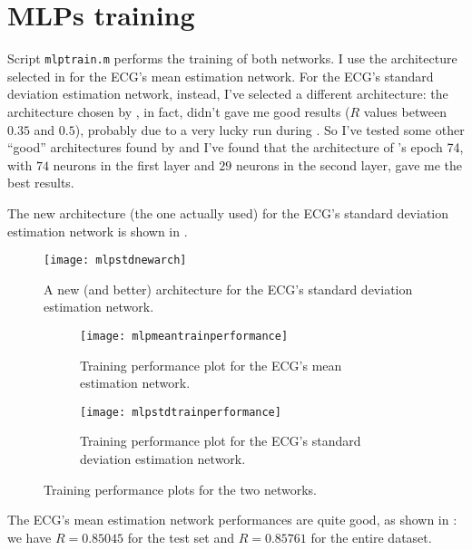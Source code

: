 \section{MLPs training}\label{sec:mlptraining}

Script \texttt{mlptrain.m} performs the training of both networks. I use the
architecture selected in  for the ECG's mean
estimation network. For the ECG's standard deviation estimation network,
instead, I've selected a different architecture: the architecture chosen by
, in fact, didn't gave me good results (\(R\) values between
\(0.35\) and \(0.5\)), probably due to a very lucky run during .
So I've tested some other ``good'' architectures found by  and
I've found that the architecture of 's epoch 74, with \(74\)
neurons in the first layer and \(29\) neurons in the second layer, gave me the
best results.

The new architecture (the one actually used) for the ECG's standard deviation
estimation network is shown in .

\begin{figure}[htbp]
	\centering
	\texttt{[image: mlpstdnewarch]}
	\caption{A new (and better) architecture for the ECG's standard
	deviation estimation network.}\label{fig:mlpstdnewarch}
\end{figure}

\begin{figure}[htbp]
	\centering
	\begin{subfigure}{\textwidth}
		\centering
		\texttt{[image: mlpmeantrainperformance]}
		\caption{Training performance plot for the ECG's mean
		estimation network.}\label{fig:mlpmeantrainperformance}
	\end{subfigure}
	\begin{subfigure}{\textwidth}
		\centering
		\texttt{[image: mlpstdtrainperformance]}
		\caption{Training performance plot for the ECG's standard
		deviation estimation network.}\label{fig:mlpstdtrainperformance}
	\end{subfigure}
	\caption{Training performance plots for the two
	networks.}\label{fig:mlptrainperformance}
\end{figure}

The ECG's mean estimation network performances are quite good, as shown in
: we have \(R = 0.85045\) for the test set and
\(R = 0.85761\) for the entire dataset.

